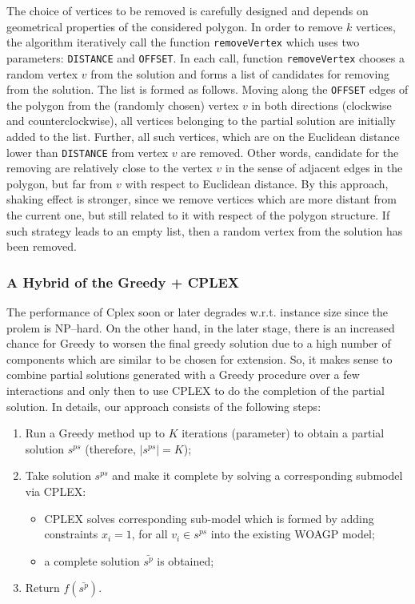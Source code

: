 \documentclass[runningheads,a4paper]{elsarticle}
\begin{document}
The choice of vertices to be removed is carefully designed and depends on geometrical properties of the considered polygon. In order to remove $k$ vertices, the algorithm iteratively call the function \texttt{removeVertex} which uses two parameters: \texttt{DISTANCE} and \texttt{OFFSET}. In each call, function \texttt{removeVertex} chooses a random vertex $v$ from the solution and forms a list of candidates for removing from the solution. The list is formed as follows. Moving along the \texttt{OFFSET} edges of the polygon from the (randomly chosen) vertex $v$ in both directions (clockwise and counterclockwise), all vertices belonging to the partial solution are initially added to the list. Further, all such vertices, which are on the Euclidean distance lower than \texttt{DISTANCE} from vertex $v$ are removed. Other words, candidate for the removing are relatively close to the vertex $v$ in the sense of adjacent edges in the polygon, but far from $v$ with respect to Euclidean distance. By this approach, shaking effect is stronger, since we remove vertices which are more distant from the current one, but still related to it with respect of the polygon structure. If such strategy leads to an empty list, then a random vertex from the solution has been removed.
	
\subsubsection{A Hybrid of the Greedy + CPLEX}  
	The performance of \textrm{Cplex}  soon or later degrades w.r.t. instance size since the prolem is NP--hard. On the other hand, in the later stage, there is an increased chance for Greedy to worsen the final greedy solution due to a high number of components which are similar to be chosen for extension. So, it makes sense to combine  partial solutions generated with a Greedy procedure over a few interactions  and only then to use CPLEX to do the completion of the partial solution. In details, our approach consists of the following steps:
	\begin{enumerate}
		\item Run a Greedy method up to $K$ iterations (parameter) to obtain a partial solution $s^{ps}$ (therefore, $|s^{ps}| = K$);
		\item Take solution $s^{ps}$ and make it complete by solving a corresponding submodel via CPLEX:
		\begin{itemize}
			\item CPLEX solves corresponding sub-model which is formed by adding constraints $x_{i} = 1$, for all $v_i \in s^{ps}$ into the existing WOAGP model;
			\item a complete solution $\bar {s^p}$ is obtained;
		\end{itemize}
		\item Return $f(\bar {s^p})$.
	\end{enumerate}
	
\end{document}
